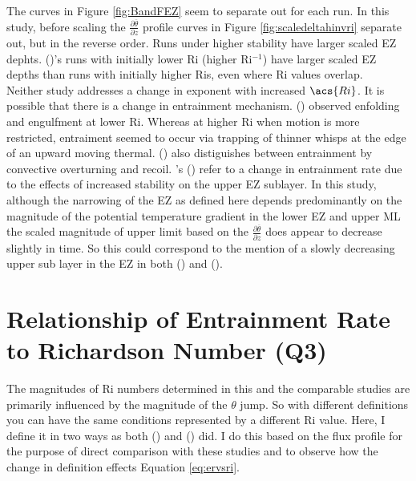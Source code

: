 The curves in Figure \ref{fig:BandFEZ} seem to separate out for each run.  In this study, before scaling the $\frac{\partial \overline{\theta}}{\partial z}$ profile curves in Figure \ref{fig:scaledeltahinvri} separate out, but in the reverse order.  Runs under higher stability have larger scaled \acs{EZ} dephts.  \citeauthor{BrooksFowler2} (\citeyear{BrooksFowler2})'s runs with initially lower \acs{Ri} (higher \acs{Ri}$^{-1}$) have larger scaled \acs{EZ} depths than runs with initially higher \acs{Ri}s, even where \acs{Ri} values overlap.\\     

Neither study addresses a change in exponent with increased $\acs{Ri}$.  It is possible that there is a change in entrainment mechanism. \citeauthor{SullMoengStev} (\citeyear{SullMoengStev}) observed enfolding and engulfment at lower \acs{Ri}.  Whereas at higher \acs{Ri} when motion is more restricted, entraiment seemed to occur via trapping of thinner whisps at the edge of an upward moving thermal.  \citeauthor{Turner86} (\citeyear{Turner86}) also distiguishes between entrainment by convective overturning and recoil. \citeauthor{GarciaMellado}'s (\citeyear{GarciaMellado}) refer to a change in entrainment rate due to the effects of increased stability on the upper \acs{EZ} sublayer.  In this study, although the narrowing of the \acs{EZ} as defined here depends predominantly on the magnitude of the potential temperature gradient in the lower \acs{EZ} and upper \acs{ML} the scaled magnitude of upper limit based on the $\frac{\partial \overline{\theta}}{\partial z}$ does appear to decrease slightly in time.  So this could correspond to the mention of a slowly decreasing upper sub layer in the \acs{EZ} in both \citeauthor{GarciaMellado} (\citeyear{GarciaMellado}) and \citeauthor{FedConzMir04} (\citeyear{FedConzMir04}).\\

\section{Relationship of Entrainment Rate to Richardson Number (Q3)}

The magnitudes of \acs{Ri} numbers determined in this and the comparable studies are primarily influenced by the magnitude of the $\theta$ jump. So with different definitions you can have the same conditions represented by a different \acs{Ri} value. Here, I define it in two ways as both \citeauthor{FedConzMir04} (\citeyear{FedConzMir04}) and \citeauthor{GarciaMellado} (\citeyear{GarciaMellado}) did.  I do this based on the flux profile for the purpose of direct comparison with these studies and to observe how the change in definition effects Equation \ref{eq:ervsri}.\\

